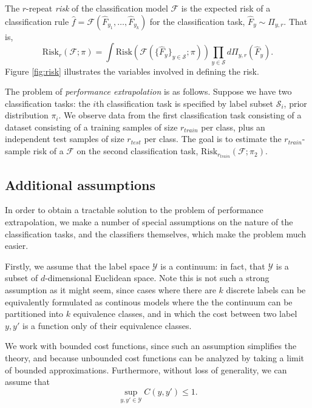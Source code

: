 \documentclass[12pt]{article}
\begin{document}
The $r$-repeat \emph{risk} of the classification model $\mathcal{F}$
is the expected risk of a classification rule $\hat{f} =
\mathcal{F}(\hat{F}_{y_1},\hdots, \hat{F}_{y_k})$ for the
classification task, $\hat{F}_y \sim \Pi_{y, r}$.  That is,
\[
\text{Risk}_r(\mathcal{F}; \pi) =
\int \text{Risk}(\mathcal{F}(\{\hat{F}_y\}_{y \in \mathcal{S}};
\pi)) \prod_{y \in \mathcal{S}} d\Pi_{y, r}(\hat{F}_y).
\]
Figure \ref{fig:risk} illustrates the variables involved in defining
the risk.

The problem of \emph{performance extrapolation} is as follows.
Suppose we have two classification tasks: the $i$th classification
task is specified by label subset $\mathcal{S}_i$, prior distribution
$\pi_i$.  We observe data from the first classification task
consisting of a dataset consisting of a training samples of size
$r_{train}$ per class, plus an independent test samples of size
$r_{test}$ per class.  The goal is to estimate the $r_{train}$-sample
risk of a $\mathcal{F}$ on the second classification task,
$\text{Risk}_{r_{train}}(\mathcal{F}; \pi_2)$.

\subsection{Additional assumptions}

In order to obtain a tractable solution to the problem of performance
extrapolation, we make a number of special assumptions on the nature
of the classification tasks, and the classifiers themselves, which
make the problem much easier.

Firstly, we assume that the label space $\mathcal{Y}$ is a continuum:
in fact, that $\mathcal{Y}$ is a subset of $d$-dimensional Euclidean
space. Note this is not such a strong assumption as it might seem,
since cases where there are $k$ discrete labels can be equivalently
formulated as continous models where the the continuum can be
partitioned into $k$ equivalence classes, and in which the cost
between two label $y, y'$ is a function only of their equivalence
classes.

We work with bounded cost functions, since such an assumption
simplifies the theory, and because unbounded cost functions can be
analyzed by taking a limit of bounded approximations.  Furthermore,
without loss of generality, we can assume that
\[
\sup_{y, y'\in \mathcal{Y}} C(y, y') \leq 1.
\]
\end{document}

